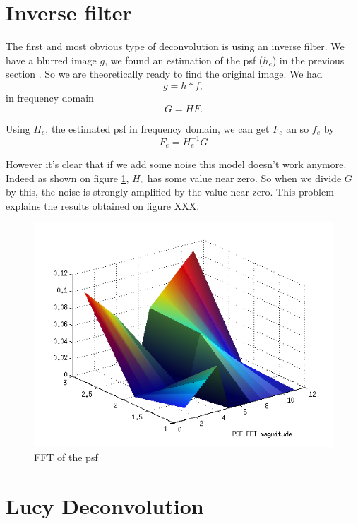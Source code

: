 \section{Inverse filter}
The first and most obvious type of deconvolution is using an inverse filter. We have a blurred image $g$, we found an estimation of the psf ($h_e$) in the previous section %
. So we are theoretically ready to find the original image. We had
\begin{equation}
 g =  h*f,
\end{equation}
in frequency domain
\begin{equation}
G = HF. 
\end{equation}

Using $H_e$, the estimated psf in frequency domain, we can get $F_e$ an so $f_e$ by 
\begin{equation}
F_{e} = H_{e}^{-1} G
\end{equation} 

However it's clear that if we add some noise this model doesn't work anymore. Indeed as shown on figure \ref{fig:psfFFT}, $H_e$ has some value near zero. So when we divide $G$ by this, the noise is strongly amplified by the value near zero. This problem explains the results obtained on figure XXX. %

\begin{figure}
\centering
\includegraphics[scale=0.5]{../Images/psfFFT.png}
\caption{FFT of the psf}
\label{fig:psfFFT}
\end{figure}



\section{Lucy Deconvolution}



